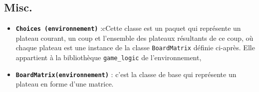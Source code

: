 \subsection{Misc.}
\begin{itemize}
  \item \textbf {\texttt{\gls{Choices} (environnement)}} :cCette classe est un paquet qui représente un plateau courant, un coup et l'ensemble des plateaux résultants de ce coup, où chaque plateau est une instance de la classe \texttt{\gls{BoardMatrix}} définie ci-après. Elle appartient à la bibliothèque \texttt{\gls{game_logic}} de l'environnement,
  \item \textbf {\texttt{\gls{BoardMatrix}(environnement)}} : c'est la classe de base qui représente un plateau en forme d'une matrice. 
  \end{itemize}
